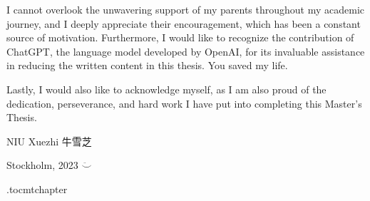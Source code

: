 I cannot overlook the unwavering support of my parents throughout my academic journey, and I deeply appreciate their encouragement, which has been a constant source of motivation. Furthermore, I would like to recognize the contribution of ChatGPT, the language model developed by OpenAI, for its invaluable assistance in reducing the written content in this thesis. You saved my life.

Lastly, I would also like to acknowledge myself, as I am also proud of the dedication, perseverance, and hard work I have put into completing this Master's Thesis.

\vspace{2cm}
\hfill NIU Xuezhi 牛雪芝

\hfill Stockholm, \monthname{ }2023 $\ddot\smile$

\newpage



\newpage

\etocdepthtag.toc{mtchapter}

\tableofcontents
\newpage